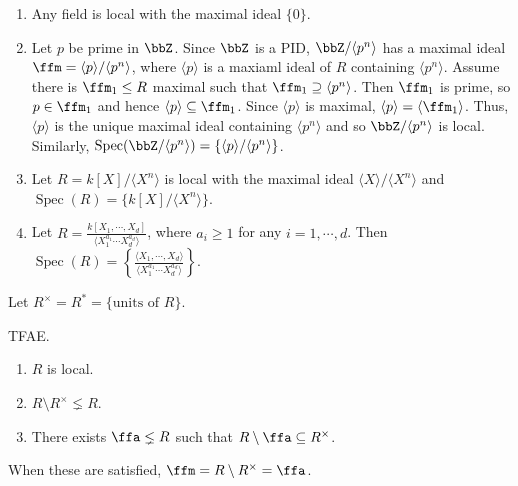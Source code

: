 \begin{example}
    \begin{enumerate}[(1)]
        \item Any field is local with the maximal ideal $\{0\}$.
        \item Let $p$ be prime in $\bbZ$. Since $\bbZ$ is a PID, $\bbZ/\langle p^n \rangle$ has a maximal ideal $\ffm = \langle p \rangle/\langle p^n \rangle$, where $\langle p \rangle$ is a maxiaml ideal of $R$ containing $\langle p^n \rangle$. Assume there is $\ffm_1 \leq R$ maximal such that $\ffm_1 \supseteq \langle p^n \rangle$. Then $\ffm_1$ is prime, so $p \in \ffm_1$ and hence $\langle p \rangle \subseteq \ffm_1$. Since $\langle p \rangle$ is maximal, $\langle p \rangle = \langle \ffm_1 \rangle$. Thus, $\langle p \rangle$ is the unique maximal ideal containing $\langle p^n \rangle$ and so $\bbZ/\langle p^n \rangle$ is local. Similarly, $\operatorname{Spec}(\bbZ/\langle p^n \rangle) = \left\{\langle p \rangle/\langle p^n \rangle\right\}$. 
        \item Let $R = k[X]/\langle X^n \rangle$ is local with the maximal ideal $\langle X \rangle / \langle X^n \rangle$ and $\operatorname{Spec}(R) = \{k[X]/\langle X^n \rangle\}$.
        \item Let $R = \frac{k[X_1,\cdots,X_d]}{\langle X_1^{a_1} \cdots X_d^{a_d}\rangle}$, where $a_i \geq 1$ for any $i = 1,\cdots,d$. Then $\operatorname{Spec}(R) = \left\{\frac{\langle X_1,\cdots,X_d\rangle}{\langle X_1^{a_1} \cdots X_d^{a_d}\rangle}\right\}$.
    \end{enumerate}
\end{example}

\begin{remark}[Notation]
    Let $R^\times = R^* = \{\text{units of }R\}$.
\end{remark}

\begin{proposition}
    TFAE.
    \begin{enumerate}[(1)]
        \item $R$ is local.
        \item $R \setminus R^\times \lneq R$.
        \item There exists $\ffa \lneq R$ such that $R \setminus \ffa \subseteq R^\times$.
    \end{enumerate}
    When these are satisfied, $\ffm = R \setminus R^\times = \ffa$.
\end{proposition}

